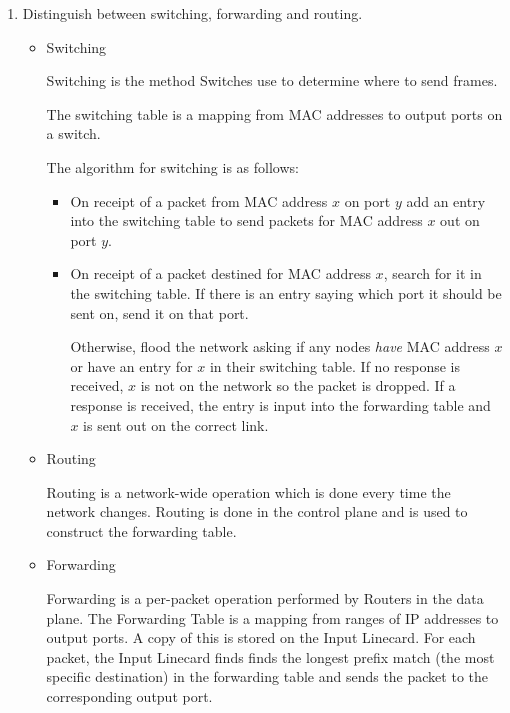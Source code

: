 \documentclass[10pt,\jkfside,a4paper]{article}
\begin{document}
\begin{enumerate}

\item Distinguish between switching, forwarding and routing.

\begin{itemize}

\item Switching

Switching is the method Switches use to determine where to send frames.

The switching table is a mapping from MAC addresses to output ports on a
switch.

The algorithm for switching is as follows:
\begin{itemize}

\item On receipt of a packet from MAC address $x$ on port $y$ add an entry
into the switching table to send packets for MAC address $x$ out on port $y$.

\item On receipt of a packet destined for MAC address $x$, search for it in
the switching table. If there is an entry saying which port it should be
sent on, send it on that port.

Otherwise, flood the network asking if any nodes \textit{have} MAC address
$x$ or have an entry for $x$ in their switching table. If no response is
received, $x$ is not on the network so the packet is dropped. If a response
is received, the entry is input into the forwarding table and $x$ is sent
out on the correct link.

\end{itemize}

\item Routing

Routing is a network-wide operation which is done every time the network
changes. Routing is done in the control plane and is used to construct the
forwarding table.

\item Forwarding

Forwarding is a per-packet operation performed by Routers in the data plane.
The Forwarding Table is a mapping from ranges of IP addresses to output
ports. A copy of this is stored on the Input Linecard. For each packet, the
Input Linecard finds finds the longest prefix match (the most specific
destination) in the forwarding table and sends the packet to the
corresponding output port.

\end{itemize}


\end{enumerate}
\end{document}
